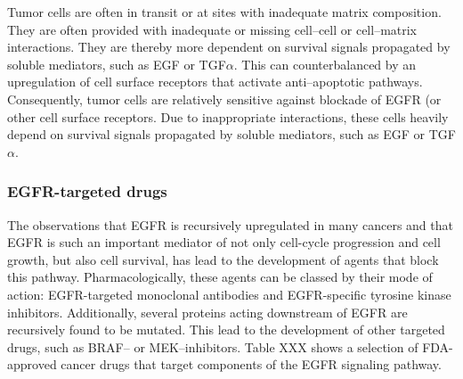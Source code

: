 {{{        Tumor cells are often in transit or at sites with inadequate matrix
        composition. They are often provided with inadequate or missing
        cell--cell or cell--matrix interactions. They are thereby more dependent
        on survival signals propagated by soluble mediators, such as EGF or
        TGF$\alpha$. This can counterbalanced by an upregulation of cell surface
        receptors that activate anti--apoptotic pathways. Consequently, tumor
        cells are relatively sensitive against blockade of EGFR (or other cell
        surface receptors. Due to inappropriate interactions, these cells
        heavily depend on survival signals propagated by soluble mediators,
        such as EGF or TGF$\alpha$.

    \subsubsection{EGFR-targeted drugs}

      The observations that EGFR is recursively upregulated in many cancers
      and that EGFR is such an important mediator of not only cell-cycle
      progression and cell growth, but also cell survival, has lead to the
      development of agents that block this pathway. Pharmacologically,
      these agents can be classed by their mode of action: EGFR-targeted
      monoclonal antibodies and EGFR-specific tyrosine kinase inhibitors.
      Additionally, several proteins acting downstream of EGFR are recursively
      found to be mutated. This lead to the development of other targeted
      drugs, such as BRAF-- or MEK--inhibitors. Table XXX shows a selection
      of FDA-approved cancer drugs that target components of the EGFR signaling
      pathway.

}}}
